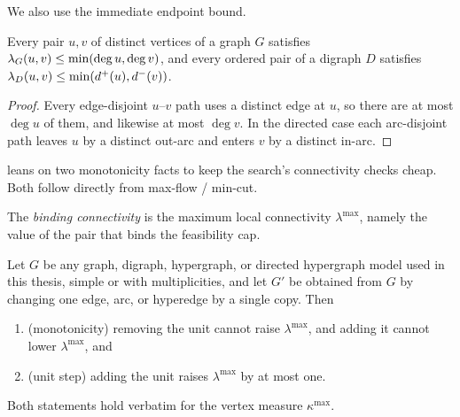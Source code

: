 We also use the immediate endpoint bound.

\begin{lemma}\label{lem:degree-bound}
Every pair $u, v$ of distinct vertices of a graph $G$ satisfies $\lambda_G(u, v) \le \min(\deg u, \deg v)$, and every ordered pair of a digraph $D$ satisfies $\lambda_D(u, v) \le \min(d^+(u), d^-(v))$.
\end{lemma}

\begin{proof}
Every edge-disjoint $u$--$v$ path uses a distinct edge at $u$, so there are at most $\deg u$ of them, and likewise at most $\deg v$. In the directed case each arc-disjoint path leaves $u$ by a distinct out-arc and enters $v$ by a distinct in-arc.
\end{proof}

 leans on two monotonicity facts to keep the search's connectivity checks cheap. Both follow directly from max-flow / min-cut.

The \emph{binding connectivity} is the maximum local connectivity
$\lambda^{\max}$, namely the value of the pair that binds the feasibility cap.

\begin{proposition}\label{prop:monotone}
Let $G$ be any graph, digraph, hypergraph, or directed hypergraph model used in this thesis, simple or with multiplicities, and let $G'$ be obtained from $G$ by changing one edge, arc, or hyperedge by a single copy. Then
\begin{enumerate}[label=(\arabic*)]
    \item \textup{(monotonicity)} removing the unit cannot raise $\lambda^{\max}$, and adding it cannot lower $\lambda^{\max}$, and
    \item \textup{(unit step)} adding the unit raises $\lambda^{\max}$ by at most one.
\end{enumerate}
Both statements hold verbatim for the vertex measure $\kappa^{\max}$.
\end{proposition}

